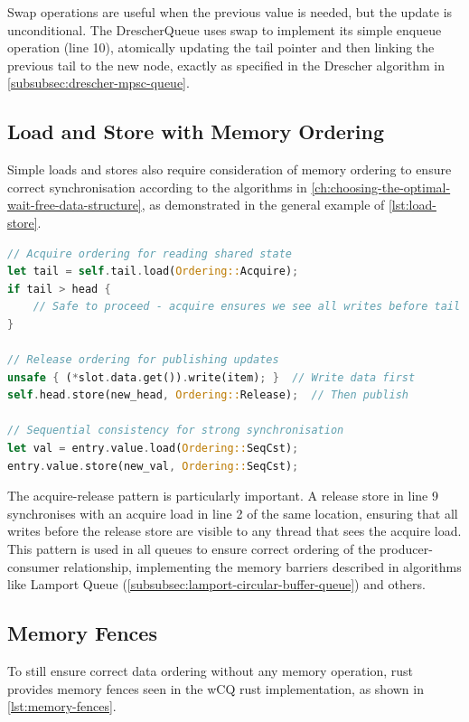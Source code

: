 Swap operations are useful when the previous value is needed, but the update is unconditional. The DrescherQueue uses swap to implement its simple enqueue operation (line 10), atomically updating the tail pointer and then linking the previous tail to the new node, exactly as specified in the Drescher algorithm in \cref{subsubsec:drescher-mpsc-queue}.

\subsection{Load and Store with Memory Ordering}

Simple loads and stores also require consideration of memory ordering to ensure correct synchronisation according to the algorithms in \cref{ch:choosing-the-optimal-wait-free-data-structure}, as demonstrated in the general example of \cref{lst:load-store}.

\begin{lstlisting}[language=Rust, style=boxed, caption={Memory ordering for loads and stores}, label={lst:load-store}]
// Acquire ordering for reading shared state
let tail = self.tail.load(Ordering::Acquire);
if tail > head {
    // Safe to proceed - acquire ensures we see all writes before tail update
}

// Release ordering for publishing updates
unsafe { (*slot.data.get()).write(item); }  // Write data first
self.head.store(new_head, Ordering::Release);  // Then publish

// Sequential consistency for strong synchronisation
let val = entry.value.load(Ordering::SeqCst);
entry.value.store(new_val, Ordering::SeqCst);
\end{lstlisting}

The acquire-release pattern is particularly important. A release store in line 9 synchronises with an acquire load in line 2 of the same location, ensuring that all writes before the release store are visible to any thread that sees the acquire load. This pattern is used in all queues to ensure correct ordering of the producer-consumer relationship, implementing the memory barriers described in algorithms like Lamport Queue (\cref{subsubsec:lamport-circular-buffer-queue}) and others.

\subsection{Memory Fences}

To still ensure correct data ordering without any memory operation, rust provides memory fences seen in the \ac{wCQ} rust implementation, as shown in \cref{lst:memory-fences}.

